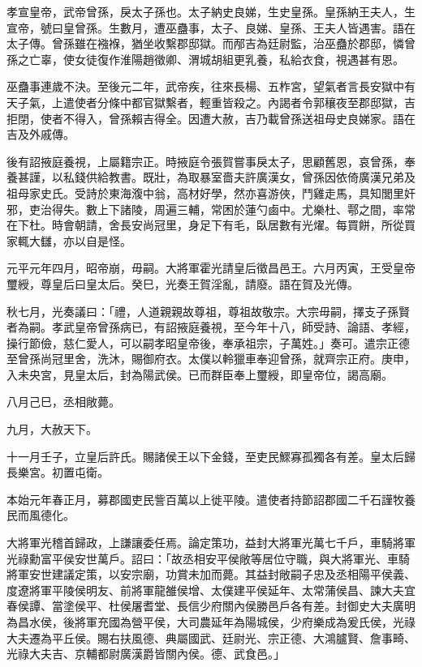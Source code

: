 
\begin{pinyinscope}
孝宣皇帝，武帝曾孫，戾太子孫也。太子納史良娣，生史皇孫。皇孫納王夫人，生宣帝，號曰皇曾孫。生數月，遭巫蠱事，太子、良娣、皇孫、王夫人皆遇害。語在太子傳。曾孫雖在襁褓，猶坐收繫郡邸獄。而邴吉為廷尉監，治巫蠱於郡邸，憐曾孫之亡辜，使女徒復作淮陽趙徵卿、渭城胡組更乳養，私給衣食，視遇甚有恩。

巫蠱事連歲不決。至後元二年，武帝疾，往來長楊、五柞宮，望氣者言長安獄中有天子氣，上遣使者分條中都官獄繫者，輕重皆殺之。內謁者令郭穰夜至郡邸獄，吉拒閉，使者不得入，曾孫賴吉得全。因遭大赦，吉乃載曾孫送祖母史良娣家。語在吉及外戚傳。

後有詔掖庭養視，上屬籍宗正。時掖庭令張賀嘗事戾太子，思顧舊恩，哀曾孫，奉養甚謹，以私錢供給教書。既壯，為取暴室嗇夫許廣漢女，曾孫因依倚廣漢兄弟及祖母家史氏。受詩於東海澓中翁，高材好學，然亦喜游俠，鬥雞走馬，具知閭里奸邪，吏治得失。數上下諸陵，周遍三輔，常困於蓮勺鹵中。尤樂杜、鄠之間，率常在下杜。時會朝請，舍長安尚冠里，身足下有毛，臥居數有光燿。每買餅，所從買家輒大讎，亦以自是怪。

元平元年四月，昭帝崩，毋嗣。大將軍霍光請皇后徵昌邑王。六月丙寅，王受皇帝璽綬，尊皇后曰皇太后。癸巳，光奏王賀淫亂，請廢。語在賀及光傳。

秋七月，光奏議曰：「禮，人道親親故尊祖，尊祖故敬宗。大宗毋嗣，擇支子孫賢者為嗣。孝武皇帝曾孫病已，有詔掖庭養視，至今年十八，師受詩、論語、孝經，操行節儉，慈仁愛人，可以嗣孝昭皇帝後，奉承祖宗，子萬姓。」奏可。遣宗正德至曾孫尚冠里舍，洗沐，賜御府衣。太僕以軨獵車奉迎曾孫，就齊宗正府。庚申，入未央宮，見皇太后，封為陽武侯。已而群臣奉上璽綬，即皇帝位，謁高廟。

八月己巳，丞相敞薨。

九月，大赦天下。

十一月壬子，立皇后許氏。賜諸侯王以下金錢，至吏民鰥寡孤獨各有差。皇太后歸長樂宮。初置屯衛。

本始元年春正月，募郡國吏民訾百萬以上徙平陵。遣使者持節詔郡國二千石謹牧養民而風德化。

大將軍光稽首歸政，上謙讓委任焉。論定策功，益封大將軍光萬七千戶，車騎將軍光祿勳富平侯安世萬戶。詔曰：「故丞相安平侯敞等居位守職，與大將軍光、車騎將軍安世建議定策，以安宗廟，功賞未加而薨。其益封敞嗣子忠及丞相陽平侯義、度遼將軍平陵侯明友、前將軍龍雒侯增、太僕建平侯延年、太常蒲侯昌、諫大夫宜春侯譚、當塗侯平、杜侯屠耆堂、長信少府關內侯勝邑戶各有差。封御史大夫廣明為昌水侯，後將軍充國為營平侯，大司農延年為陽城侯，少府樂成為爰氏侯，光祿大夫遷為平丘侯。賜右扶風德、典屬國武、廷尉光、宗正德、大鴻臚賢、詹事畸、光祿大夫吉、京輔都尉廣漢爵皆關內侯。德、武食邑。」


\end{pinyinscope}

